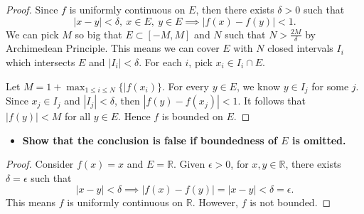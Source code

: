 \begin{Exercise}
	\begin{proof}
		Since $f$ is uniformly continuous on $E$, then there exists $\delta>0$ such that
		$$
		|x-y|<\delta,\ x\in E,\ y\in E \implies |f(x)-f(y)|< 1.
		$$
		We can pick $M$ so big that $E\subset [-M,M]$ and $N$ such that $N>\frac{2M}{\delta}$ by Archimedean Principle.
		This means we can cover $E$ with $N$ closed intervals $I_i$ which intersects $E$ and $|I_i|<\delta$.
		For each $i$, pick $x_i\in I_i\cap E$.
		
		Let $M = 1 + \max_{1\leq i \leq N}\{|f(x_i)\}$.
		For every $y\in E$, we know $y\in I_j$ for some $j$.
		Since $x_j\in I_j$ and $|I_j|<\delta$, then $|f(y)-f(x_j)|<1$.
		It follows that $|f(y)|<M$ for all $y\in E$.
		Hence $f$ is bounded on $E$.
	\end{proof}
	\begin{itemize}
		\item \textbf{Show that the conclusion is false if boundedness of $E$ is omitted.}
	\end{itemize}
	\begin{proof}
		Consider $f(x) = x$ and $E = \mathbb{R}$.
		Given $\epsilon>0$, for $x,y\in \mathbb{R}$, there exists $\delta = \epsilon$ such that
		$$
		|x-y|<\delta \implies |f(x)-f(y)| = |x-y| < \delta = \epsilon.
		$$
		This means $f$ is uniformly continuous on $\mathbb{R}$.
		However, $f$ is not bounded.
	\end{proof}
\end{Exercise}